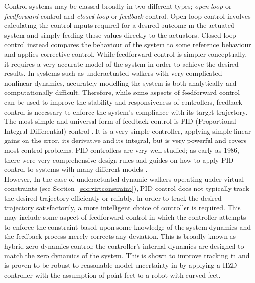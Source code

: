 Control systems may be classed broadly in two different types; \textit{open-loop} or \textit{feedforward} control and \textit{closed-loop} or \textit{feedback} control. Open-loop control involves calculating the control inputs required for a desired outcome in the actuated system and simply feeding those values directly to the actuators. Closed-loop control instead compares the behaviour of the system to some reference behaviour and applies corrective control. While feedforward control is simpler conceptually, it requires a very accurate model of the system in order to achieve the desired results. In systems such as underactuated walkers with very complicated nonlinear dynamics, accurately modelling the system is both analytically and computationally difficult. Therefore, while some aspects of feedforward control can be used to improve the stability and responsiveness of controllers, feedback control is necessary to enforce the system's compliance with its target trajectory. \\

The most simple and universal form of feedback control is PID (Proportional Integral Differential) control \cite{aastrom2001future}. It is a very simple controller, applying simple linear gains on the error, its derivative and its integral, but is very powerful and covers most control problems. PID controllers are very well studied; as early as 1986, there were very comprehensive design rules and guides on how to apply PID control to systems with many different models \cite{rivera1986internal}. \\

However, In the case of underactuated dynamic walkers operating under virtual constraints (see Section~\ref{sec:virtconstraint}), PID control does not typically track the desired trajectory efficiently or reliably. In order to track the desired trajectory satisfactorily, a more intelligent choice of controller is required. This may include some aspect of feedforward control in which the controller attempts to enforce the constraint based upon some knowledge of the system dynamics and the feedback process merely corrects any deviation. This is broadly known as hybrid-zero dynamics control; the controller's internal dynamics are designed to match the zero dynamics of the system. This is shown to improve tracking in \cite{sreenath2011compliant} and is proven to be robust to reasonable model uncertainty in \cite{martin2014design} by applying a HZD controller with the assumption of point feet to a robot with curved feet. \\

